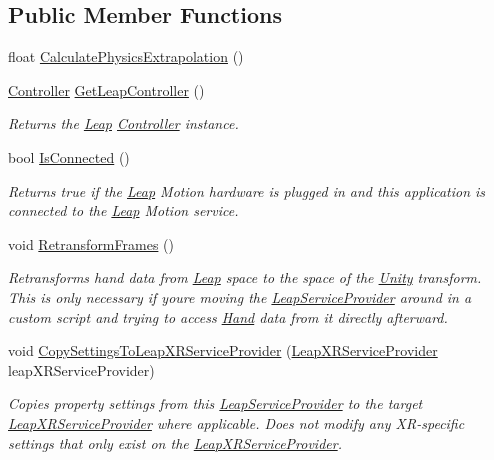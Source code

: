 \subsection*{Public Member Functions}
\begin{DoxyCompactItemize}
\item 
float \mbox{\hyperlink{class_leap_1_1_unity_1_1_leap_service_provider_ad930af3ae3d63279248bd7f41ab58671}{Calculate\+Physics\+Extrapolation}} ()
\item 
\mbox{\hyperlink{class_leap_1_1_controller}{Controller}} \mbox{\hyperlink{class_leap_1_1_unity_1_1_leap_service_provider_aa146d4e24722ff4b68adeb23e6a1c24e}{Get\+Leap\+Controller}} ()
\begin{DoxyCompactList}\small\item\em Returns the \mbox{\hyperlink{namespace_leap_1_1_unity_1_1_leap}{Leap}} \mbox{\hyperlink{class_leap_1_1_controller}{Controller}} instance. \end{DoxyCompactList}\item 
bool \mbox{\hyperlink{class_leap_1_1_unity_1_1_leap_service_provider_aeee4a41aefc20b7268f284340b6f793a}{Is\+Connected}} ()
\begin{DoxyCompactList}\small\item\em Returns true if the \mbox{\hyperlink{namespace_leap_1_1_unity_1_1_leap}{Leap}} Motion hardware is plugged in and this application is connected to the \mbox{\hyperlink{namespace_leap_1_1_unity_1_1_leap}{Leap}} Motion service. \end{DoxyCompactList}\item 
void \mbox{\hyperlink{class_leap_1_1_unity_1_1_leap_service_provider_a8e864272647ed7001524df393505ddf3}{Retransform\+Frames}} ()
\begin{DoxyCompactList}\small\item\em Retransforms hand data from \mbox{\hyperlink{namespace_leap_1_1_unity_1_1_leap}{Leap}} space to the space of the \mbox{\hyperlink{namespace_leap_1_1_unity}{Unity}} transform. This is only necessary if you\textquotesingle{}re moving the \mbox{\hyperlink{class_leap_1_1_unity_1_1_leap_service_provider}{Leap\+Service\+Provider}} around in a custom script and trying to access \mbox{\hyperlink{class_leap_1_1_hand}{Hand}} data from it directly afterward. \end{DoxyCompactList}\item 
void \mbox{\hyperlink{class_leap_1_1_unity_1_1_leap_service_provider_ada1aaf6421decbb20a418c412193033c}{Copy\+Settings\+To\+Leap\+X\+R\+Service\+Provider}} (\mbox{\hyperlink{class_leap_1_1_unity_1_1_leap_x_r_service_provider}{Leap\+X\+R\+Service\+Provider}} leap\+X\+R\+Service\+Provider)
\begin{DoxyCompactList}\small\item\em Copies property settings from this \mbox{\hyperlink{class_leap_1_1_unity_1_1_leap_service_provider}{Leap\+Service\+Provider}} to the target \mbox{\hyperlink{class_leap_1_1_unity_1_1_leap_x_r_service_provider}{Leap\+X\+R\+Service\+Provider}} where applicable. Does not modify any X\+R-\/specific settings that only exist on the \mbox{\hyperlink{class_leap_1_1_unity_1_1_leap_x_r_service_provider}{Leap\+X\+R\+Service\+Provider}}. \end{DoxyCompactList}\end{DoxyCompactItemize}
